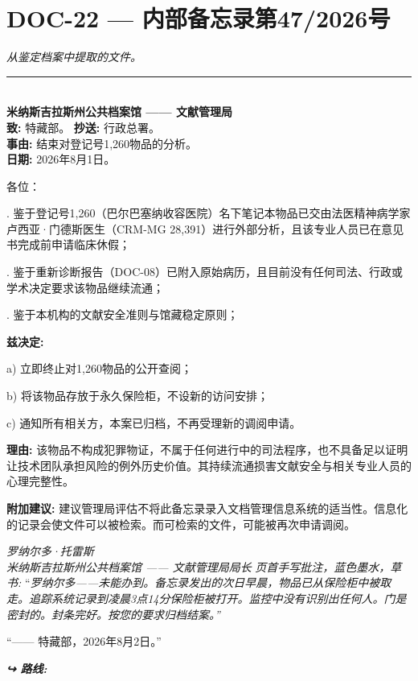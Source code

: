 \section*{\textbf{DOC-22} --- 内部备忘录第47/2026号}

\noindent \textit{从鉴定档案中提取的文件。}

\vspace{0.5em}\noindent\rule{\textwidth}{0.5pt}\vspace{0.5em}


\\[-0.2em]

\noindent \textbf{米纳斯吉拉斯州公共档案馆 —— 文献管理局}\\
\noindent \textbf{致:} 特藏部。 \textbf{抄送:} 行政总署。\\
\noindent \textbf{事由:} 结束对登记号1,260物品的分析。\\
\noindent\textbf{日期:} 2026年8月1日。

\noindent 各位：

. 鉴于登记号1,260（巴尔巴塞纳收容医院）名下笔记本物品已交由法医精神病学家卢西亚·门德斯医生（CRM-MG 28,391）进行外部分析，且该专业人员已在意见书完成前申请临床休假；

. 鉴于重新诊断报告（DOC-08）已附入原始病历，且目前没有任何司法、行政或学术决定要求该物品继续流通；

. 鉴于本机构的文献安全准则与馆藏稳定原则；

\noindent \textbf{兹决定:}

\noindent a) 立即终止对1,260物品的公开查阅；

\noindent b) 将该物品存放于永久保险柜，不设新的访问安排；

\noindent c) 通知所有相关方，本案已归档，不再受理新的调阅申请。

\noindent \textbf{理由:} 该物品不构成犯罪物证，不属于任何进行中的司法程序，也不具备足以证明让技术团队承担风险的例外历史价值。其持续流通损害文献安全与相关专业人员的心理完整性。

\noindent \textbf{附加建议:} 建议管理局评估不将此备忘录录入文档管理信息系统的适当性。信息化的记录会使文件可以被检索。而可检索的文件，可能被再次申请调阅。

\noindent \textit{罗纳尔多·托雷斯}\\
\noindent \textit{米纳斯吉拉斯州公共档案馆 —— 文献管理局局长}
\noindent \textit{页首手写批注，蓝色墨水，草书:}
\noindent \textquotedblleft{\textit{罗纳尔多——未能办到。备忘录发出的次日早晨，物品已从保险柜中被取走。追踪系统记录到凌晨3点14分保险柜被打开。监控中没有识别出任何人。门是密封的。封条完好。按您的要求归档结案。”}}

\noindent “—— 特藏部，2026年8月2日。”





\vspace{0.5em}
\noindent\textit{\textbf{↪ 路线:}  \rotasep {} \rotasep {}}

